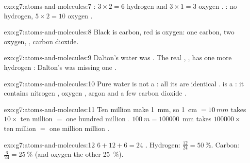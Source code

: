 \begin{solution}{exo:g7:atoms-and-molecules:7}
: $3\times 2 = 6$ hydrogen  and $3\times 1 = 3$ oxygen
. : no hydrogen, $5\times 2 = 10$ oxygen .
\end{solution}

\begin{solution}{exo:g7:atoms-and-molecules:8}
Black is carbon, red is oxygen: one carbon, two oxygen, ,
carbon dioxide.
\end{solution}

\begin{solution}{exo:g7:atoms-and-molecules:9}
Dalton's water was . The real , , has one more
hydrogen : Dalton's  was missing one .
\end{solution}

\begin{solution}{exo:g7:atoms-and-molecules:10}
Pure water is not a : all its  are identical 
.  is a : it contains nitrogen , oxygen
, argon  and a few carbon dioxide .
\end{solution}

\begin{solution}{exo:g7:atoms-and-molecules:11}
Ten million  make \qty{1}{mm}, so \qty{1}{cm} $= \qty{10}{mm}$
takes $10 \times$ ten million $=$ one hundred million .
$\qty{100}{m} = \num{100000}$~mm takes $\num{100000}\times$ ten million
$=$ one million million .
\end{solution}

\begin{solution}{exo:g7:atoms-and-molecules:12}
$6 + 12 + 6 = 24$ . Hydrogen: $\frac{12}{24} = \qty{50}{\percent}$.
Carbon: $\frac{6}{24} = \qty{25}{\percent}$ (and oxygen the other
\qty{25}{\percent}).
\end{solution}

